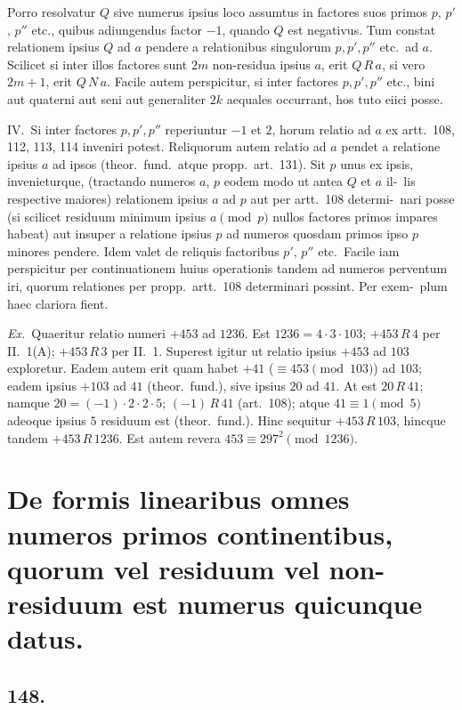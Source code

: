 \documentclass[12pt,a4paper]{article}
\theoremstyle{plain}
\theoremstyle{definition}
\theoremstyle{remark}
\begin{document}
Porro resolvatur $Q$ sive numerus ipsius loco assumtus in factores suos
primos $p$, $p'$, $p''$ etc., quibus adiungendus factor $-1$, quando $Q$ est negativus.
Tum constat relationem ipsius $Q$ ad $a$ pendere a relationibus singulorum $p,p',p''$
etc.\ ad $a$. Scilicet si inter illos factores sunt $2m$ non-residua ipsius $a$, erit $Q \, R \, a$,
si vero $2m+1$, erit $Q \, N \, a$. Facile autem perspicitur, si inter factores $p,p',p''$
etc., bini aut quaterni aut seni aut generaliter $2k$ aequales occurrant, hos tuto
eiici posse.

IV.\ Si inter factores $p,p',p''$ reperiuntur $-1$ et $2$, horum relatio ad $a$ ex
artt.~108, 112, 113, 114 inveniri potest. Reliquorum autem relatio ad $a$ pendet a
relatione ipsius $a$ ad ipsos (theor.\ fund.\ atque propp.\ art.~131). Sit $p$ unus ex
ipsis, invenieturque, (tractando numeros $a$, $p$ eodem modo ut antea $Q$ et $a$ il-\ lis respective maiores) relationem ipsius $a$ ad $p$ aut per artt.~108 determi-\ nari posse (si scilicet residuum minimum ipsius $a \pmod{p}$ nullos factores primos
impares habeat) aut insuper a relatione ipsius $p$ ad numeros quosdam primos
ipso $p$ minores pendere. Idem valet de reliquis factoribus $p'$, $p''$ etc.\ Facile iam
perspicitur per continuationem huius operationis tandem ad numeros perventum
iri, quorum relationes per propp.\ artt.~108 determinari possint. Per exem-\ plum haec clariora fient.

\emph{Ex.}\ Quaeritur relatio numeri $+453$ ad $1236$. Est $1236 = 4 \cdot 3 \cdot 103$;
$+453 \, R \, 4$ per II.\ 1(A); $+453 \, R \, 3$ per II.\ 1. Superest igitur ut relatio ipsius
$+453$ ad $103$ exploretur. Eadem autem erit quam habet $+41$ ($\equiv 453 \pmod{103}$)
ad $103$; eadem ipsius $+103$ ad $41$ (theor.\ fund.), sive ipsius $20$ ad $41$.
At est $20 \, R \, 41$; namque $20 = (-1) \cdot 2 \cdot 2 \cdot 5$; $(-1) \, R \, 41$ (art.~108); atque
$41 \equiv 1 \pmod{5}$ adeoque ipsius $5$ residuum est (theor.\ fund.). Hinc
sequitur $+453 \, R \, 103$, hincque tandem $+453 \, R \, 1236$. Est autem revera $453 \equiv
297^2 \pmod{1236}$.

\section*{De formis linearibus omnes numeros primos continentibus, quorum vel residuum vel non-residuum est numerus quicunque datus.}

\subsection*{148.}
\end{document}
